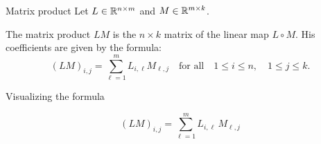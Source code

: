 \documentclass{beamer}
\begin{document}
\begin{frame}[t]{Matrix product}
	Let $L \in \mathbb{R}^{n \times m}$ and $M \in \mathbb{R}^{m \times k}$. 
	\vspace{2cm}
\begin{definition}
	The matrix product $LM$ is the $n \times k$ matrix of the linear map $L \circ M$.
	His coefficients are given by the formula:
	$$
	(LM)_{i,j} = \sum_{\ell=1}^m L_{i,\ell} M_{\ell,j} \quad \text{for all} \quad 1 \leq i \leq n, \quad 1 \leq j \leq k.
	$$
\end{definition}
\end{frame}
\begin{frame}[t]{Visualizing the formula}
	\vspace{-0.8cm}
	\begin{exampleblock}{}
	\vspace{-0.3cm}
	$$
	(LM)_{i,j} = \sum_{\ell=1}^m L_{i,\ell} \, M_{\ell,j} 
	$$
	\vspace{-0.1cm}
\end{exampleblock}
\end{frame}
\end{document}
